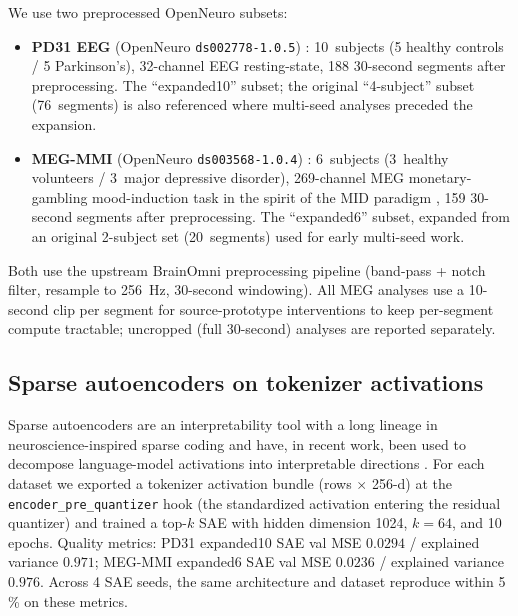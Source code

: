 \documentclass[11pt]{article}
\begin{document}
We use two preprocessed OpenNeuro subsets:
\begin{itemize}
\item \textbf{PD31 EEG} (OpenNeuro \texttt{ds002778-1.0.5})
\cite{ds002778}: 10~subjects (5 healthy controls / 5 Parkinson's),
32-channel EEG resting-state, 188 30-second segments after
preprocessing. The ``expanded10'' subset; the original ``4-subject''
subset (76~segments) is also referenced where multi-seed analyses
preceded the expansion.
\item \textbf{MEG-MMI} (OpenNeuro \texttt{ds003568-1.0.4})
\cite{ds003568}: 6~subjects (3~healthy volunteers / 3~major
depressive disorder), 269-channel MEG monetary-gambling
mood-induction task in the spirit of the MID paradigm
\cite{knutson2001mid}, 159 30-second segments after preprocessing.
The ``expanded6'' subset, expanded from an original 2-subject set
(20~segments) used for early multi-seed work.
\end{itemize}
Both use the upstream BrainOmni preprocessing pipeline (band-pass + notch
filter, resample to 256~Hz, 30-second windowing). All MEG analyses use a
10-second clip per segment for source-prototype interventions to keep
per-segment compute tractable; uncropped (full 30-second) analyses are
reported separately.

\subsection{Sparse autoencoders on tokenizer activations}

Sparse autoencoders are an interpretability tool with a long lineage in
neuroscience-inspired sparse coding \cite{olshausen1996} and have, in
recent work, been used to decompose language-model activations into
interpretable directions
\cite{bricken2023monosemanticity,cunningham2024sae,templeton2024scaling,gao2024scaling,rajamanoharan2024gated,lieberum2024gemma}.
For each dataset we exported a tokenizer activation bundle
(rows $\times$ 256-d) at the \texttt{encoder\_pre\_quantizer} hook (the
standardized activation entering the residual quantizer) and trained a
top-$k$ SAE \cite{gao2024scaling} with hidden dimension 1024, $k = 64$,
and 10 epochs. Quality metrics: PD31 expanded10 SAE val MSE $0.0294$ /
explained variance $0.971$; MEG-MMI expanded6 SAE val MSE $0.0236$ /
explained variance $0.976$. Across 4 SAE seeds, the same architecture
and dataset reproduce within 5\,\% on these metrics.

\end{document}
